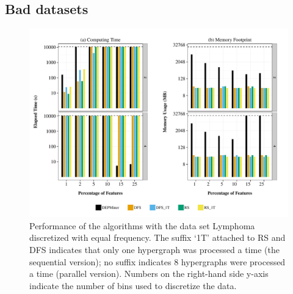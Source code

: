 \documentclass[12pt,a4paper]{article}
\begin{document}
\clearpage
\subsection*{Bad datasets}

\begin{figure}[htb]
\begin{center}
\includegraphics[scale=0.65]{lymphoma_ef}
\end{center}
\caption{Performance of the algorithms with the data set Lymphoma discretized with equal frequency.
The suffix `1T' attached to RS and DFS indicates that only one hypergraph was processed a time (the
sequential version); no suffix indicates 8 hypergraphs were processed a time (parallel version).
Numbers on the right-hand side y-axis indicate the number of bins used to discretize the data.}
\label{qcep:fig:lymphomaef}
\end{figure}
\end{document}
